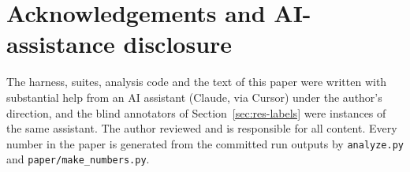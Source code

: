 \section*{Acknowledgements and AI-assistance disclosure}
The harness, suites, analysis code and the text of this paper were written with substantial help
from an AI assistant (Claude, via Cursor) under the author's direction, and the blind annotators
of Section~\ref{sec:res-labels} were instances of the same assistant. The author reviewed and is
responsible for all content. Every number in the paper is generated from the committed run
outputs by \texttt{analyze.py} and \texttt{paper/make\_numbers.py}.

